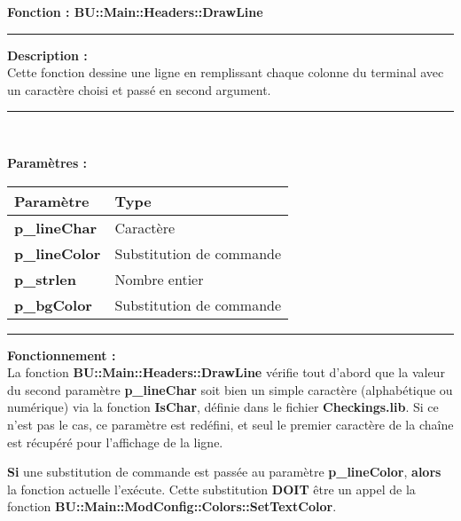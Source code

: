 \documentclass[a4paper,10pt]{article}
\begin{document}
\textbf{Fonction : \color{mauve}BU::Main::Headers::DrawLine}\setlength{\parskip}{1em}

\par\noindent\rule{\textwidth}{0.4pt}

\begin{justify}
    \textbf{Description :}\\[1\baselineskip]
    Cette fonction dessine une ligne en remplissant chaque colonne du terminal avec un caractère choisi et passé en second argument.
\end{justify}

\par\noindent\rule{\textwidth}{0.4pt}\\

\begin{justify}
    \textbf{Paramètres :}

    \begin{tabular}{|l|l|}
        \hline
        \textbf{Paramètre} & \textbf{Type}\\
        \hline
        \textbf{\color{orange}p\_lineChar} & Caractère\\
        \hline
        \textbf{\color{orange}p\_lineColor} & Substitution de commande\\
        \hline
        \textbf{\color{orange}p\_strlen} & Nombre entier\\
        \hline
        \textbf{\color{orange}p\_bgColor} & Substitution de commande\\
        \hline
    \end{tabular}
\end{justify}

\par\noindent\rule{\textwidth}{0.4pt}

\begin{justify}
    \textbf{Fonctionnement :}\\[1\baselineskip]
    La fonction \textbf{\color{mauve}BU::Main::Headers::DrawLine} vérifie tout d'abord que la valeur du second paramètre \textbf{\color{orange}p\_lineChar} soit bien un simple caractère (alphabétique ou numérique) via la fonction \textbf{\color{mauve}IsChar}, définie dans le fichier \textbf{\color{lime}Checkings.lib}. Si ce n'est pas le cas, ce paramètre est redéfini, et seul le premier caractère de la chaîne est récupéré pour l'affichage de la ligne.
\end{justify}

\begin{justify}
    \textbf{\color{brick}Si} une substitution de commande est passée au paramètre \textbf{\color{orange}p\_lineColor}, \textbf{\color{brick}alors} la fonction actuelle l'exécute. Cette substitution \textbf{DOIT} être un appel de la fonction \textbf{\color{mauve}BU::Main::ModConfig::Colors::SetTextColor}.
\end{justify}
\end{document}
